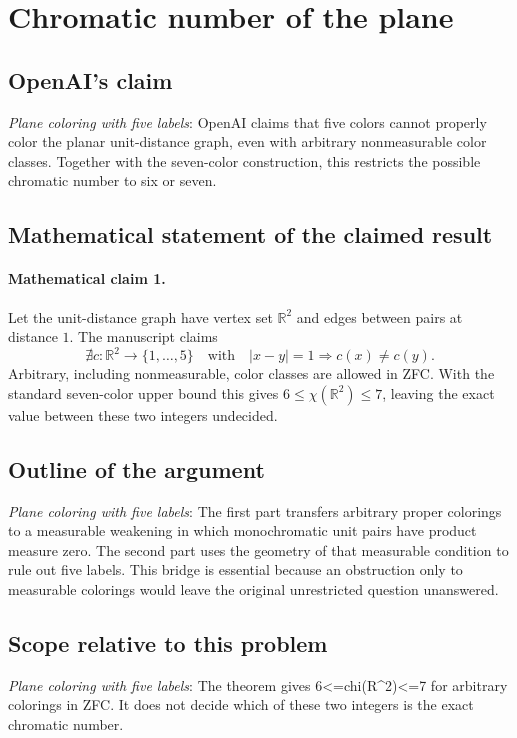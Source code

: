 \documentclass[11pt]{article}
\begin{document}
\section*{Chromatic number of the plane}

\subsection{OpenAI's claim}
\textit{Plane coloring with five labels}: OpenAI claims that five colors cannot properly color the planar unit-distance graph, even with arbitrary nonmeasurable color classes. Together with the seven-color construction, this restricts the possible chromatic number to six or seven.

\subsection{Mathematical statement of the claimed result}
\paragraph{Mathematical claim 1.} Let the unit-distance graph have vertex set $\mathbb R^2$ and edges between pairs at distance $1$. The manuscript claims \[\nexists c:\mathbb R^2\to\{1,\ldots,5\}\quad\text{with}\quad|x-y|=1\Longrightarrow c(x)\ne c(y).\] Arbitrary, including nonmeasurable, color classes are allowed in ZFC. With the standard seven-color upper bound this gives $6\le\chi(\mathbb R^2)\le7$, leaving the exact value between these two integers undecided.

\subsection{Outline of the argument}
\textit{Plane coloring with five labels}: The first part transfers arbitrary proper colorings to a measurable weakening in which monochromatic unit pairs have product measure zero. The second part uses the geometry of that measurable condition to rule out five labels. This bridge is essential because an obstruction only to measurable colorings would leave the original unrestricted question unanswered.

\subsection{Scope relative to this problem}
\textit{Plane coloring with five labels}: The theorem gives 6<=chi(R\textasciicircum{}2)<=7 for arbitrary colorings in ZFC. It does not decide which of these two integers is the exact chromatic number.
\end{document}
